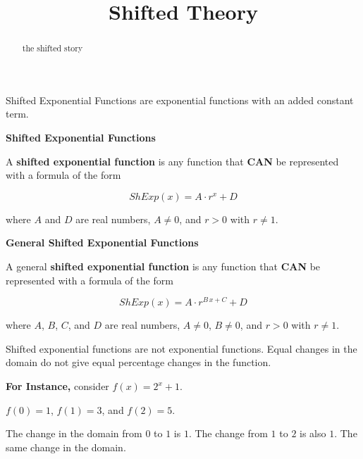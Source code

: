 \documentclass{ximera}
\title{Shifted Theory}
\begin{document}
\begin{abstract}
the shifted story
\end{abstract}
\maketitle





Shifted Exponential Functions are exponential functions with an added constant term.






\begin{definition} \textbf{\textcolor{green!50!black}{Shifted Exponential Functions}}

A \textbf{shifted exponential function} is any function that \textbf{\textcolor{purple!85!blue}{CAN}} be represented with a formula of the form

\[     ShExp(x) =    A \cdot r^x  + D         \]

where $A$ and $D$ are real numbers, $A \ne 0$, and $r > 0$ with $r \ne 1$.


\end{definition}






\begin{definition} \textbf{\textcolor{green!50!black}{General Shifted Exponential Functions}}

A general \textbf{shifted exponential function} is any function that \textbf{\textcolor{purple!85!blue}{CAN}} be represented with a formula of the form

\[     ShExp(x) =    A \cdot r^{B \, x + C}  + D         \]

where $A$, $B$, $C$, and $D$ are real numbers, $A \ne 0$, $B \ne 0$, and $r > 0$ with $r \ne 1$.


\end{definition}




Shifted exponential functions are not exponential functions.  Equal changes in the domain do not give equal percentage changes in the function. 



\textbf{For Instance,} consider $f(x) = 2^{x} + 1$. 


$f(0) = 1$, $f(1) = 3$, and $f(2) = 5$. 

The change in the domain from $0$ to $1$ is $1$.  The change from $1$ to $2$ is also $1$. The same change in the domain.
\end{document}
